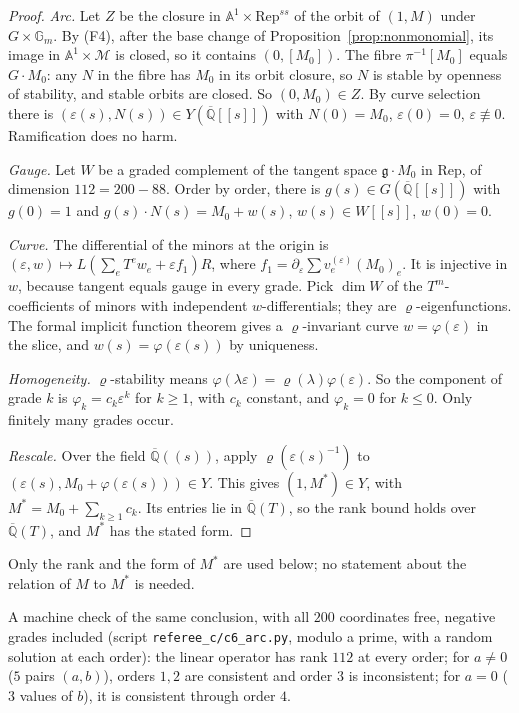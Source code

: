 \documentclass[11pt,a4paper]{article}
\theoremstyle{plain}
\theoremstyle{definition}
\newcommand{\Qbar}{\overline{\mathbb{Q}}}
\newcommand{\Gm}{\mathbb{G}_{m}}
\newcommand{\Aff}{\mathbb{A}^{1}}
\newcommand{\Rep}{\mathrm{Rep}}
\newcommand{\Mm}{\mathcal{M}}
\newcommand{\scr}[1]{\nolinkurl{#1}}
\begin{document}
\begin{proof}
\emph{Arc.} Let $Z$ be the closure in $\Aff\times\Rep^{ss}$ of the orbit of $(1,M)$ under $G\times\Gm$. By (F4), after the base change of Proposition~\ref{prop:nonmonomial}, its image in $\Aff\times\Mm$ is closed, so it contains $(0,[M_{0}])$. The fibre $\pi^{-1}[M_{0}]$ equals $G\cdot M_{0}$: any $N$ in the fibre has $M_{0}$ in its orbit closure, so $N$ is stable by openness of stability, and stable orbits are closed. So $(0,M_{0})\in Z$. By curve selection there is $(\varepsilon(s),N(s))\in Y(\Qbar[[s]])$ with $N(0)=M_{0}$, $\varepsilon(0)=0$, $\varepsilon\not\equiv0$. Ramification does no harm.

\emph{Gauge.} Let $W$ be a graded complement of the tangent space $\mathfrak g\cdot M_{0}$ in $\Rep$, of dimension $112=200-88$. Order by order, there is $g(s)\in G(\Qbar[[s]])$ with $g(0)=1$ and $g(s)\cdot N(s)=M_{0}+w(s)$, $w(s)\in W[[s]]$, $w(0)=0$.

\emph{Curve.} The differential of the minors at the origin is $(\varepsilon,w)\mapsto L(\sum_{e}T^{e}w_{e}+\varepsilon f_{1})R$, where $f_{1}=\partial_{\varepsilon}\sum v_{e}^{(\varepsilon)}(M_{0})_{e}$. It is injective in $w$, because tangent equals gauge in every grade. Pick $\dim W$ of the $T^{m}$-coefficients of minors with independent $w$-differentials; they are $\varrho$-eigenfunctions. The formal implicit function theorem gives a $\varrho$-invariant curve $w=\varphi(\varepsilon)$ in the slice, and $w(s)=\varphi(\varepsilon(s))$ by uniqueness.

\emph{Homogeneity.} $\varrho$-stability means $\varphi(\lambda\varepsilon)=\varrho(\lambda)\varphi(\varepsilon)$. So the component of grade $k$ is $\varphi_{k}=c_{k}\varepsilon^{k}$ for $k\ge1$, with $c_{k}$ constant, and $\varphi_{k}=0$ for $k\le0$. Only finitely many grades occur.

\emph{Rescale.} Over the field $\Qbar((s))$, apply $\varrho(\varepsilon(s)^{-1})$ to $(\varepsilon(s),M_{0}+\varphi(\varepsilon(s)))\in Y$. This gives $(1,M^{*})\in Y$, with $M^{*}=M_{0}+\sum_{k\ge1}c_{k}$. Its entries lie in $\Qbar(T)$, so the rank bound holds over $\Qbar(T)$, and $M^{*}$ has the stated form.
\end{proof}

Only the rank and the form of $M^{*}$ are used below; no statement about the relation of $M$ to $M^{*}$ is needed.

A machine check of the same conclusion, with all $200$ coordinates free, negative grades included (script \scr{referee_c/c6_arc.py}, modulo a prime, with a random solution at each order): the linear operator has rank $112$ at every order; for $a\neq0$ ($5$ pairs $(a,b)$), orders $1,2$ are consistent and order $3$ is inconsistent; for $a=0$ ($3$ values of $b$), it is consistent through order $4$.
\end{document}
